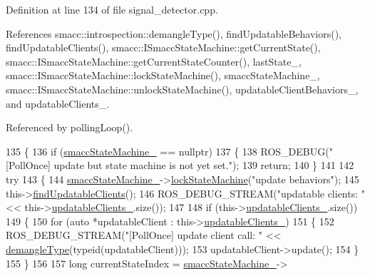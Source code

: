 Definition at line 134 of file signal\+\_\+detector.\+cpp.



References smacc\+::introspection\+::demangle\+Type(), find\+Updatable\+Behaviors(), find\+Updatable\+Clients(), smacc\+::\+I\+Smacc\+State\+Machine\+::get\+Current\+State(), smacc\+::\+I\+Smacc\+State\+Machine\+::get\+Current\+State\+Counter(), last\+State\+\_\+, smacc\+::\+I\+Smacc\+State\+Machine\+::lock\+State\+Machine(), smacc\+State\+Machine\+\_\+, smacc\+::\+I\+Smacc\+State\+Machine\+::unlock\+State\+Machine(), updatable\+Client\+Behaviors\+\_\+, and updatable\+Clients\+\_\+.



Referenced by polling\+Loop().


\begin{DoxyCode}
135 \{
136     \textcolor{keywordflow}{if} (\hyperlink{classsmacc_1_1SignalDetector_a46025de6ac7b5980e22144f9703236a4}{smaccStateMachine\_} == \textcolor{keyword}{nullptr})
137     \{
138         ROS\_DEBUG(\textcolor{stringliteral}{"[PollOnce] update but state machine is not yet set."});
139         \textcolor{keywordflow}{return};
140     \}
141 
142     \textcolor{keywordflow}{try}
143     \{
144         \hyperlink{classsmacc_1_1SignalDetector_a46025de6ac7b5980e22144f9703236a4}{smaccStateMachine\_}->\hyperlink{classsmacc_1_1ISmaccStateMachine_a5c8d4c9a4b11c7950266a00e48080ce3}{lockStateMachine}(\textcolor{stringliteral}{"update behaviors"});
145         this->\hyperlink{classsmacc_1_1SignalDetector_a47ec2df560e2e33758ce3975bece9385}{findUpdatableClients}();
146         ROS\_DEBUG\_STREAM(\textcolor{stringliteral}{"updatable clients: "} << this->\hyperlink{classsmacc_1_1SignalDetector_a01a457b4ec935473d6426efb7b87e683}{updatableClients\_}.size());
147 
148         \textcolor{keywordflow}{if} (this->\hyperlink{classsmacc_1_1SignalDetector_a01a457b4ec935473d6426efb7b87e683}{updatableClients\_}.size())
149         \{
150             \textcolor{keywordflow}{for} (\textcolor{keyword}{auto} *updatableClient : this->\hyperlink{classsmacc_1_1SignalDetector_a01a457b4ec935473d6426efb7b87e683}{updatableClients\_})
151             \{
152                 ROS\_DEBUG\_STREAM(\textcolor{stringliteral}{"[PollOnce] update client call:  "} << 
      \hyperlink{namespacesmacc_1_1introspection_a670e39ccea29952859df4e2d0e45077b}{demangleType}(\textcolor{keyword}{typeid}(updatableClient)));
153                 updatableClient->update();
154             \}
155         \}
156 
157         \textcolor{keywordtype}{long} currentStateIndex = \hyperlink{classsmacc_1_1SignalDetector_a46025de6ac7b5980e22144f9703236a4}{smaccStateMachine\_}->

\end{DoxyCode}
